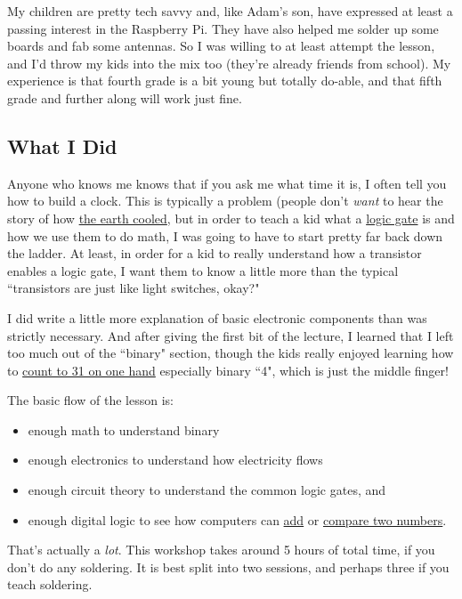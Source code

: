 My children are pretty tech savvy and, like Adam's son, have expressed at least a passing interest in the Raspberry Pi. They have also helped me solder up some boards and fab some antennas. So I was willing to at least attempt the lesson, and I'd throw my kids into the mix too (they're already friends from school). My experience is that fourth grade is a bit young but totally do-able, and that fifth grade and further along will work just fine.

\subsection*{What I Did}
Anyone who knows me knows that if you ask me what time it is, I often tell you how to build a clock. This is typically a problem (people don't \emph{want} to hear the story of how {\color{webblue}\href{http://www.imdb.com/title/tt0083530/quotes#qt1422044}{the earth cooled}}, but in order to teach a kid what a {\color{webblue}\href{https://en.wikipedia.org/wiki/Logic_gate}{logic gate}} is and how we use them to do math, I was going to have to start pretty far back down the ladder. At least, in order for a kid to really understand how a transistor enables a logic gate, I want them to know a little more than the typical ``transistors are just like light switches, okay?"

I did write a little more explanation of basic electronic components than was strictly necessary. And after giving the first bit of the lecture, I learned that I left too much out of the ``binary" section, though the kids really enjoyed learning how to {\color{webblue}\href{https://en.wikipedia.org/wiki/Finger_binary}{count to 31 on one hand}} especially binary ``4", which is just the middle finger!

The basic flow of the lesson is:
\begin{itemize}
\item enough math to understand binary
\item enough electronics to understand how electricity flows
\item enough circuit theory to understand the common logic gates, and
\item enough digital logic to see how computers can {\color{webblue}\href{https://en.wikipedia.org/wiki/Adder_(electronics)}{add}} or {\color{webblue}\href{https://en.wikipedia.org/wiki/XNOR_gate}{compare two numbers}}.
\end{itemize} 

That's actually a \emph{lot}. This workshop takes around 5 hours of total time, if you don't do any soldering.
It is best split into two sessions, and perhaps three if you teach soldering.


